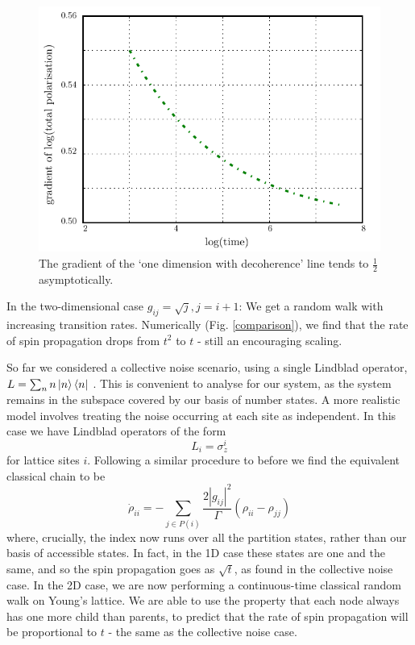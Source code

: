 \begin{figure}
  \begin{center}
    \includegraphics{assets/asymptotic_1d.pdf}
  \end{center}
  \caption{ The gradient of the `one dimension with decoherence' line tends to $\frac{1}{2}$ asymptotically.}
  \label{asymptotic_1d}
\end{figure}

In the two-dimensional case $g_{ij} = \sqrt{j}, j=i+1$: We get a random walk with increasing transition rates. Numerically (Fig. \ref{comparison}), we find that the rate of spin propagation drops from $t^2$ to $t$ - still an encouraging scaling.


So far we considered a collective noise scenario, using a single Lindblad operator, $ L=\sum_{n}n\left\vert n\right\rangle\left\langle n\right\vert$ . This is convenient to analyse for our system, as the system remains in the subspace covered by our basis of number states. A more realistic model involves treating the noise occurring at each site as independent. In this case we have Lindblad operators of the form
\begin{equation}
  L_i = \sigma_z^i
\end{equation}
for lattice sites $i$. Following a similar procedure to before we find the equivalent classical chain to be
\begin{equation}
  \dot{\rho}_{ii}=-\sum_{j\in
  P(i)}\frac{2|g_{ij}|^{2}}{\Gamma}\left(\rho_{ii}-\rho_{jj}\right)
  \label{qmat}
\end{equation}
where, crucially, the index now runs over all the partition states, rather than our basis of accessible states. In fact, in the 1D case these states are one and the same, and so the spin propagation goes as $\sqrt{t}$, as found in the collective noise case. In the 2D case, we are now performing a continuous-time classical random walk on Young's lattice. We are able to use the property that each node always has one more child than parents, to predict that the rate of spin propagation will be proportional to $t$ - the same as the collective noise case.  

